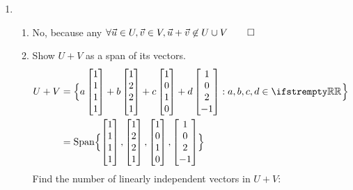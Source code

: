 \documentclass[12pt, a4paper]{article}
\begin{document}
\begin{enumerate}[Q\arabic*.]
  \item 
    \begin{enumerate}[(\alph*)]
      \item No, because any $\forall \vec{u} \in U, \vec{v} \in V, \vec{u} + \vec{v} \not\in U \cup V \qed$
      \item Show $U+V$ as a span of its vectors.
        \begin{align*}
          U + V &= \Bigl\{ a\begin{bmatrix}1\\1\\1\\1\end{bmatrix} + b\begin{bmatrix}1\\2\\2\\1\end{bmatrix} + c\begin{bmatrix}1\\0\\1\\0\end{bmatrix} + d\begin{bmatrix}1\\0\\2\\-1\end{bmatrix} : a,b,c,d \in \RR \Bigr\}\\
                &= \Span\Bigl\{ \begin{bmatrix}1\\1\\1\\1\end{bmatrix}, \begin{bmatrix}1\\2\\2\\1\end{bmatrix}, \begin{bmatrix}1\\0\\1\\0\end{bmatrix},  \begin{bmatrix}1\\0\\2\\-1\end{bmatrix}\Bigr\}
        \end{align*}
        Find the number of linearly independent vectors in $U+V$:

\end{enumerate}
\end{enumerate}
\end{document}
